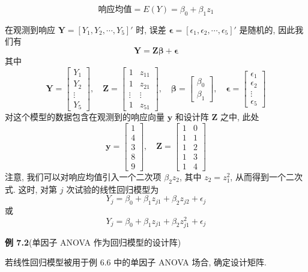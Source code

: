 

\[
\text{响应均值} = E(Y) = \beta_0+\beta_1 z_1
\]

在观测到响应 $\mathbf{Y}=[Y_1,Y_2,\cdots,Y_5]'$ 时, 误差 $\boldsymbol{\epsilon}=[\epsilon_1,\epsilon_2,\cdots,\epsilon_5]'$ 是随机的, 因此我们有
\[
\mathbf{Y}=\mathbf{Z}\boldsymbol{\beta}+\boldsymbol{\epsilon}
\]
其中
\[
\mathbf{Y}=\begin{bmatrix}Y_1\\Y_2\\\vdots\\Y_5\end{bmatrix},\quad
\mathbf{Z}=\begin{bmatrix}1&z_{11}\\1&z_{21}\\\vdots&\vdots\\1&z_{51}\end{bmatrix},\quad
\boldsymbol{\beta}=\begin{bmatrix}\beta_0\\\beta_1\end{bmatrix},\quad
\boldsymbol{\epsilon}=\begin{bmatrix}\epsilon_1\\\epsilon_2\\\vdots\\\epsilon_5\end{bmatrix}
\]
对这个模型的数据包含在观测到的响应向量 $\mathbf{y}$ 和设计阵 $\mathbf{Z}$ 之中, 此处
\[
\mathbf{y}=\begin{bmatrix}1\\4\\3\\8\\9\end{bmatrix},\quad
\mathbf{Z}=\begin{bmatrix}1&0\\1&1\\1&2\\1&3\\1&4\end{bmatrix}
\]
注意, 我们可以对响应均值引入一个二次项 $\beta_2 z_2$, 其中 $z_2=z_1^2$, 从而得到一个二次式. 这时, 对第 $j$ 次试验的线性回归模型为
\[
Y_j=\beta_0+\beta_1 z_{j1}+\beta_2 z_{j2}+\epsilon_j
\]
或
\[
Y_j=\beta_0+\beta_1 z_{j1}+\beta_2 z_{j1}^2+\epsilon_j
\]

\medskip
\noindent\textbf{例 7.2}\quad (单因子 ANOVA 作为回归模型的设计阵)

若线性回归模型被用于例 6.6 中的单因子 ANOVA 场合, 确定设计矩阵.

